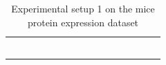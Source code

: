\documentclass{tufte-book}
\begin{document}
\begin{table}[]
\begin{tabular}{cccccccccccccccc}
                        &                                                                                                  &                                 &                              &                             &                              &                             &                              &                             &                              &                             &                              &  &  &  &  \\
                        &                                                                                                  &                                 &                              &                             &                              &                             &                              &                             &                              &                             &                              &  &  &  &  \\
                        &                                                                                                  &                                 &                              &                             &                              &                             &                              &                             &                              &                             &                              &  &  &  &  \\
                        &                                                                                                  &                                 &                              &                             &                              &                             &                              &                             &                              &                             &                              &  &  &  &  \\
                        &                                                                                                  &                                 &                              &                             &                              &                             &                              &                             &                              &                             &                              &  &  &  &  \\
                        &                                                                                                  &                                 &                              &                             &                              &                             &                              &                             &                              &                             &                              &  &  &  & 
\caption{Experimental setup 1 on the mice protein expression dataset}
			\end{tabular}
\end{table}
\end{document}
